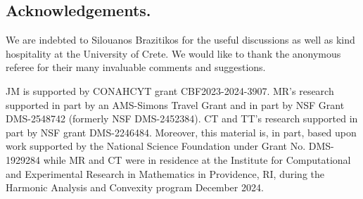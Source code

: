 \documentclass[10pt]{amsart}
\newcommand{\1}{\textbf{1}}
\theoremstyle{remark}
\theoremstyle{definition}
\begin{document}
\subsection*{Acknowledgements.}
We are indebted to Silouanos Brazitikos for the useful discussions as well as kind hospitality at the University of Crete. We would like to thank the anonymous referee for their many invaluable comments and suggestions.

JM is supported by CONAHCYT grant CBF2023-2024-3907. MR's research supported in part by an AMS-Simons Travel Grant and in part by NSF Grant DMS-2548742 (formerly NSF DMS-2452384). CT and TT's research supported in part by NSF grant DMS-2246484.
Moreover, this material is, in part, based upon work supported by the National Science Foundation under Grant No. DMS-1929284 while MR and CT were in residence at the Institute for Computational and Experimental Research in Mathematics in Providence, RI, during the Harmonic Analysis and Convexity program December 2024.
\end{document}
